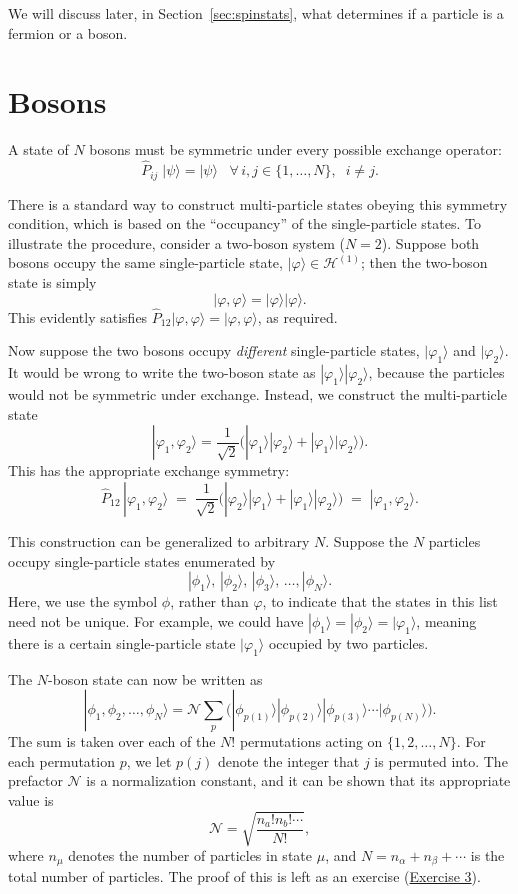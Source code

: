 \documentclass[pra,12pt]{revtex4}
\begin{document}
We will discuss later, in Section~\ref{sec:spinstats}, what determines
if a particle is a fermion or a boson.

\section{Bosons}

A state of $N$ bosons must be symmetric under every possible exchange
operator:
$$\hat{P}_{ij}\; |\psi\rangle = |\psi\rangle \;\;\; \forall\, i, j \in\{1,\dots,N\},\;\; i\ne j.$$

There is a standard way to construct multi-particle states obeying
this symmetry condition, which is based on the ``occupancy'' of the
single-particle states.  To illustrate the procedure, consider a
two-boson system ($N = 2$).  Suppose both bosons occupy the same
single-particle state, $|\varphi\rangle \in \mathscr{H}^{(1)}$; then
the two-boson state is simply
$$|\varphi,\varphi\rangle = |\varphi\rangle  |\varphi\rangle.$$
This evidently satisfies $\hat{P}_{12}
|\varphi,\varphi\rangle = |\varphi,\varphi\rangle$, as required.

Now suppose the two bosons occupy \textit{different} single-particle
states, $|\varphi_1\rangle$ and $|\varphi_2\rangle$.  It would be wrong
to write the two-boson state as $|\varphi_1\rangle |\varphi_2\rangle$,
because the particles would not be symmetric under exchange.  Instead,
we construct the multi-particle state
$$|\varphi_1,\varphi_2\rangle = \frac{1}{\sqrt{2}} \Big( |\varphi_1\rangle  |\varphi_2\rangle + |\varphi_1\rangle  |\varphi_2\rangle\Big).$$
This has the appropriate exchange symmetry:
$$\hat{P}_{12}\,|\varphi_1,\varphi_2\rangle \;=\; \frac{1}{\sqrt{2}} \Big( |\varphi_2\rangle  |\varphi_1\rangle + |\varphi_1\rangle  |\varphi_2\rangle\Big) \;=\; |\varphi_1,\varphi_2\rangle.$$

This construction can be generalized to arbitrary $N$.  Suppose the
$N$ particles occupy single-particle states enumerated by
$$|\phi_1\rangle, \, |\phi_2\rangle, \, |\phi_3\rangle, \, \dots, |\phi_N\rangle.$$
Here, we use the symbol $\phi$, rather than $\varphi$, to indicate
that the states in this list need not be unique.  For example, we
could have $|\phi_1\rangle = |\phi_2\rangle = |\varphi_1\rangle$,
meaning there is a certain single-particle state $|\varphi_1\rangle$
occupied by two particles.

The $N$-boson state can now be written as
$$|\phi_1,\phi_2,\dots,\phi_N\rangle = \mathcal{N} \sum_p \Big(|\phi_{p(1)}\rangle  |\phi_{p(2)}\rangle  |\phi_{p(3)}\rangle  \cdots  |\phi_{p(N)}\rangle\Big).$$
The sum is taken over each of the $N!$ permutations acting on
$\{1,2,\dots,N\}$.  For each permutation $p$, we let $p(j)$ denote the
integer that $j$ is permuted into.  The prefactor $\mathcal{N}$ is a
normalization constant, and it can be shown that its appropriate value
is
$$\mathcal{N} = \sqrt{\frac{n_a!n_b!\cdots}{N!}},$$
where $n_\mu$ denotes the number of particles in state $\mu$, and $N =
n_\alpha + n_\beta + \cdots$ is the total number of particles.  The proof of
this is left as an exercise (\hyperref[ex:boson_norm]{Exercise 3}).
\end{document}
